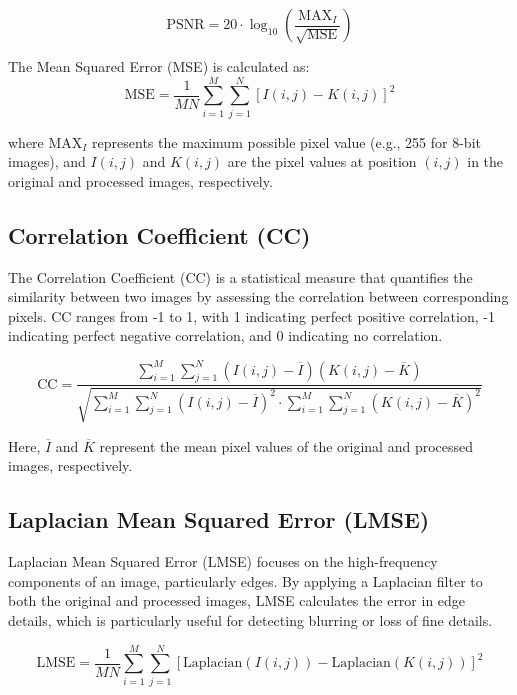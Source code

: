 \documentclass[conference]{IEEEtran}
\begin{document}
\begin{equation}
\text{PSNR} = 20 \cdot \log_{10}\left(\frac{\text{MAX}_{I}}{\sqrt{\text{MSE}}}\right)
\end{equation}

The Mean Squared Error (MSE) is calculated as:
\begin{equation}
\text{MSE} = \frac{1}{MN} \sum_{i=1}^{M} \sum_{j=1}^{N} \left[I(i,j) - K(i,j)\right]^2
\end{equation}

where \(\text{MAX}_{I}\) represents the maximum possible pixel value (e.g., 255 for 8-bit images), and \(I(i,j)\) and \(K(i,j)\) are the pixel values at position \((i,j)\) in the original and processed images, respectively.

\subsection{Correlation Coefficient (CC)}
The Correlation Coefficient (CC) is a statistical measure that quantifies the similarity between two images by assessing the correlation between corresponding pixels. CC ranges from -1 to 1, with 1 indicating perfect positive correlation, -1 indicating perfect negative correlation, and 0 indicating no correlation.

\begin{equation}
\text{CC} = \frac{\sum_{i=1}^{M} \sum_{j=1}^{N} \left(I(i,j) - \overline{I}\right) \left(K(i,j) - \overline{K}\right)}{\sqrt{\sum_{i=1}^{M} \sum_{j=1}^{N} \left(I(i,j) - \overline{I}\right)^2 \cdot \sum_{i=1}^{M} \sum_{j=1}^{N} \left(K(i,j) - \overline{K}\right)^2}}
\end{equation}

Here, \(\overline{I}\) and \(\overline{K}\) represent the mean pixel values of the original and processed images, respectively.

\subsection{Laplacian Mean Squared Error (LMSE)}
Laplacian Mean Squared Error (LMSE) focuses on the high-frequency components of an image, particularly edges. By applying a Laplacian filter to both the original and processed images, LMSE calculates the error in edge details, which is particularly useful for detecting blurring or loss of fine details.

\begin{equation}
\text{LMSE} = \frac{1}{MN} \sum_{i=1}^{M} \sum_{j=1}^{N} \left[\text{Laplacian}(I(i,j)) - \text{Laplacian}(K(i,j))\right]^2
\end{equation}
\end{document}
